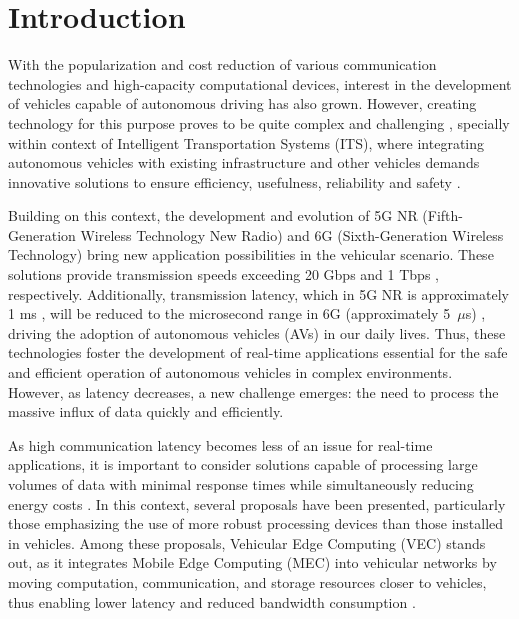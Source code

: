 \documentclass[iicol]{sn-jnl}
\begin{document}
\section{Introduction}\label{sec_introduction}
\newlength{\twocolumns}
\setlength{\twocolumns}{\dimexpr\columnwidth/2\relax} 

With the popularization and cost reduction of various communication technologies and high-capacity computational devices, interest in the development of vehicles capable of autonomous driving has also grown. However, creating technology for this purpose proves to be quite complex and challenging \cite{marko2021challenges}, specially within context of Intelligent Transportation Systems (ITS), where integrating autonomous vehicles with existing infrastructure and other vehicles demands innovative solutions to ensure efficiency, usefulness, reliability  and safety \cite{wang2023transportation}.

Building on this context, the development and evolution of 5G NR (Fifth-Generation Wireless Technology New Radio) and 6G (Sixth-Generation Wireless Technology) bring new application possibilities in the vehicular scenario. These solutions provide transmission speeds exceeding 20 Gbps and 1 Tbps \cite{morais20245g}\cite{tyagi20256g}, respectively. Additionally, transmission latency, which in 5G NR is approximately 1 ms \cite{morais20245g}, will be reduced to the microsecond range in 6G (approximately 5~$\mu$s) \cite{tyagi20256g}, driving the adoption of autonomous vehicles (AVs) in our daily lives. Thus, these technologies foster the development of real-time applications essential for the safe and efficient operation of autonomous vehicles in complex environments. However, as latency decreases, a new challenge emerges: the need to process the massive influx of data quickly and efficiently.

As high communication latency becomes less of an issue for real-time applications, it is important to consider solutions capable of processing large volumes of data with minimal response times while simultaneously reducing energy costs \cite{katare2023survey}. In this context, several proposals have been presented, particularly those emphasizing the use of more robust processing devices than those installed in vehicles. Among these proposals, Vehicular Edge Computing (VEC) stands out, as it integrates Mobile Edge Computing (MEC) into vehicular networks by moving computation, communication, and storage resources closer to vehicles, thus enabling lower latency and reduced bandwidth consumption \cite{liu2021vehicular}.
\end{document}
